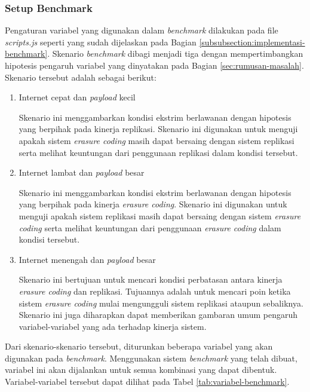\subsubsection{Setup Benchmark}
\label{subsubsection:setup-benchmark}

Pengaturan variabel yang digunakan dalam \textit{benchmark} dilakukan pada file \textit{scripts.js} seperti yang sudah dijelaskan pada Bagian \ref{subsubsection:implementasi-benchmark}. Skenario \textit{benchmark} dibagi menjadi tiga dengan mempertimbangkan hipotesis pengaruh variabel yang dinyatakan pada Bagian \ref{sec:rumusan-masalah}. Skenario tersebut adalah sebagai berikut:

\begin{enumerate}
	\item Internet cepat dan \textit{payload} kecil

	      Skenario ini menggambarkan kondisi ekstrim berlawanan dengan hipotesis yang berpihak pada kinerja replikasi. Skenario ini digunakan untuk menguji apakah sistem \textit{erasure coding} masih dapat bersaing dengan sistem replikasi serta melihat keuntungan dari penggunaan replikasi dalam kondisi tersebut.

	\item Internet lambat dan \textit{payload} besar

	      Skenario ini menggambarkan kondisi ekstrim berlawanan dengan hipotesis yang berpihak pada kinerja \textit{erasure coding}. Skenario ini digunakan untuk menguji apakah sistem replikasi masih dapat bersaing dengan sistem \textit{erasure coding} serta melihat keuntungan dari penggunaan \textit{erasure coding} dalam kondisi tersebut.

	\item Internet menengah dan \textit{payload} besar

	      Skenario ini bertujuan untuk mencari kondisi perbatasan antara kinerja \textit{erasure coding} dan replikasi. Tujuannya adalah untuk mencari poin ketika sistem \textit{erasure coding} mulai mengungguli sistem replikasi ataupun sebaliknya. Skenario ini juga diharapkan dapat memberikan gambaran umum pengaruh variabel-variabel yang ada terhadap kinerja sistem.

\end{enumerate}

Dari skenario-skenario tersebut, diturunkan beberapa variabel yang akan digunakan pada \textit{benchmark}. Menggunakan sistem \textit{benchmark} yang telah dibuat, variabel ini akan dijalankan untuk semua kombinasi yang dapat dibentuk. Variabel-variabel tersebut dapat dilihat pada Tabel \ref{tab:variabel-benchmark}.

